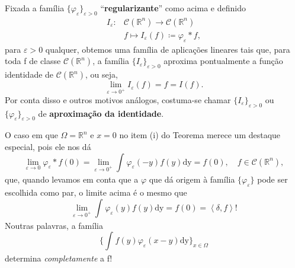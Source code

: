 \documentclass[../distribution_theory_notes.tex]{subfiles}
\begin{document}
  \begin{tcolorbox}[
  skin=enhanced,
  title=Observação,
  fonttitle=\bfseries,
colframe=black,
  colbacktitle=cyan!75!white, 
  colback=cyan!15,
  colbacklower=black,
coltitle=black,
  drop fuzzy shadow,
  ]
  Fixada a família \(\{\varphi_{\varepsilon }\}_{\varepsilon >0}\) ``\textbf{regularizante}'' como acima e definido 
 \begin{align*}
     I_{\varepsilon }:&\mathcal{C}(\mathbb{R}^{n})\rightarrow \mathcal{C}(\mathbb{R}^{n}) \\
        &f\longmapsto I_{\varepsilon }(f)\coloneqq \varphi_{\varepsilon }*f,
 \end{align*}
 para \(\varepsilon >0\) qualquer, obtemos uma família de aplicações lineares tais que, para toda f de classe \(\mathcal{C}(\mathbb{R}^{n})\), a família \(\{I_{\varepsilon }\}_{\varepsilon >0}\) aproxima pontualmente a função identidade de \(\mathcal{C}(\mathbb{R}^{n})\), ou seja, 
   \[
     \lim_{\varepsilon \to 0^{+}} I_{\varepsilon }(f)=f = I(f).
   \]
   Por conta disso e outros motivos análogos, costuma-se chamar \(\{I_{\varepsilon }\}_{\varepsilon >0}\) ou \(\{\varphi_{\varepsilon }\}_{\varepsilon >0}\) de \textbf{aproximação da identidade}.
  \end{tcolorbox}
    \begin{tcolorbox}[
    skin=enhanced,
    title=Observação,
    fonttitle=\bfseries,
  colframe=black,
    colbacktitle=cyan!75!white, 
    colback=cyan!15,
    colbacklower=black,
  coltitle=black,
    drop fuzzy shadow,
    ]
    O caso em que \(\Omega =\mathbb{R}^{n}\) e \(x=0\) no item (i) do Teorema merece um destaque especial, pois ele nos dá 
      \[
        \lim_{\varepsilon \to 0}\varphi_{\varepsilon }*f(0)=\lim_{\varepsilon \to 0^{+}}\int_{}^{}\varphi_\varepsilon (-y)f(y) \mathrm{dy}=f(0),\quad f\in \mathcal{C}(\mathbb{R}^{n}),
      \]
      que, quando levamos em conta que a \(\varphi \) que dá origem à família \(\{\varphi_{\varepsilon }\}\) pode ser escolhida como par, o limite acima é o mesmo que 
        \[
          \lim_{\varepsilon \to 0^{+}}\int_{}^{}\varphi_{\varepsilon }(y)f(y) \mathrm{dy}=f(0) = \left< \delta , f \right>!
        \]
        Noutras palavras, a família 
          \[
          \biggl\{\int_{}^{}f(y)\varphi_{\varepsilon }(x-y) \mathrm{dy}\biggr\}_{x\in \Omega }
          \]
          determina \textit{completamente} a f!
    \end{tcolorbox}
\end{document}
